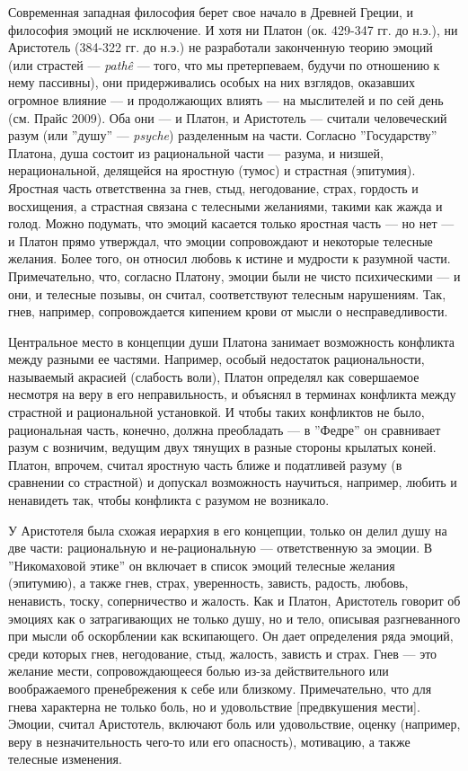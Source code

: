 \documentclass[11pt]{book}
\begin{document}
Современная западная философия берет свое начало в Древней Греции, и философия эмоций не исключение. И хотя ни Платон (ок. 429-347 гг. до н.э.), ни Аристотель (384-322 гг. до н.э.) не разработали законченную теорию эмоций (или страстей --- \textit{pathê} --- того, что мы претерпеваем, будучи по отношению к нему пассивны), они придерживались особых на них взглядов, оказавших огромное влияние --- и продолжающих влиять --- на мыслителей и по сей день (см. Прайс 2009). Оба они --- и Платон, и Аристотель --- считали человеческий разум (или ''душу'' --- \textit{psyche}) разделенным на части. Согласно ''Государству'' Платона, душа состоит из рациональной части --- разума, и низшей, нерациональной, делящейся на яростную (тумос) и страстная (эпитумия). Яростная часть ответственна за гнев, стыд, негодование, страх, гордость и восхищения, а страстная связана с телесными желаниями, такими как жажда и голод. Можно подумать, что эмоций касается только яростная часть --- но нет --- и Платон прямо утверждал, что эмоции сопровождают и некоторые телесные желания. Более того, он относил любовь к истине и мудрости к разумной части. Примечательно, что, согласно Платону, эмоции были не чисто психическими --- и они, и телесные позывы, он считал, соответствуют телесным нарушениям. Так, гнев, например, сопровождается кипением крови от мысли о несправедливости.

Центральное место в концепции души Платона занимает возможность конфликта между разными ее частями. Например, особый недостаток рациональности, называемый акрасией (слабость воли), Платон определял как совершаемое несмотря на веру в его неправильность, и объяснял в терминах конфликта между страстной и рациональной установкой. И чтобы таких конфликтов не было, рациональная часть, конечно, должна преобладать --- в ''Федре'' он сравнивает разум с возничим, ведущим двух тянущих в разные стороны крылатых коней. Платон, впрочем, считал яростную часть ближе и податливей разуму (в сравнении со страстной) и допускал возможность научиться, например, любить и ненавидеть так, чтобы конфликта с разумом не возникало.

У Аристотеля была схожая иерархия в его концепции, только он делил душу на две части: рациональную и не-рациональную --- ответственную за эмоции. В ''Никомаховой этике'' он включает в список эмоций телесные желания (эпитумию), а также гнев, страх, уверенность, зависть, радость, любовь, ненависть, тоску, соперничество и жалость. Как и Платон, Аристотель говорит об эмоциях как о затрагивающих не только душу, но и тело, описывая разгневанного при мысли об оскорблении как вскипающего. Он дает определения ряда эмоций, среди которых гнев, негодование, стыд, жалость, зависть и страх. Гнев --- это желание мести, сопровождающееся болью из-за действительного или воображаемого пренебрежения к себе или близкому. Примечательно, что для гнева характерна не только боль, но и удовольствие [предвкушения мести]. Эмоции, считал Аристотель, включают боль или удовольствие, оценку (например, веру в незначительность чего-то или его опасность), мотивацию, а также телесные изменения.
\end{document}
